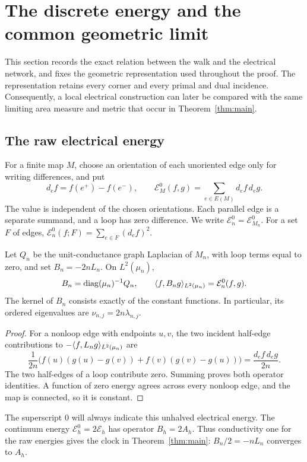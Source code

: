 \section{The discrete energy and the common geometric limit}\label{sec:model}

This section records the exact relation between the walk and the electrical
network, and fixes the geometric representation used throughout the proof.
The representation retains every corner and every primal and dual incidence.
Consequently, a local electrical construction can later be compared with the
same limiting area measure and metric that occur in Theorem~\ref{thm:main}.

\subsection{The raw electrical energy}

For a finite map \(M\), choose an orientation of each unoriented edge only for
writing differences, and put
\[
 d_e f=f(e^+)-f(e^-),\qquad
 \mathcal E_M^0(f,g)=\sum_{e\in E(M)}d_e f\,d_e g.
\]
The value is independent of the chosen orientations.  Each parallel edge is
a separate summand, and a loop has zero difference.  We write
\(\mathcal E_n^0=\mathcal E_{M_n}^0\).  For a set \(F\) of edges,
\(\mathcal E_n^0(f;F)=\sum_{e\in F}(d_e f)^2\).

\begin{lemma}\label{lem:normalization}
Let \(Q_n\) be the unit-conductance graph Laplacian of \(M_n\), with loop
terms equal to zero, and set \(B_n=-2nL_n\).  On \(L^2(\mu_n)\),
\[
 B_n=\operatorname{diag}(\mu_n)^{-1}Q_n,\qquad
 \langle f,B_ng\rangle_{L^2(\mu_n)}=\mathcal E_n^0(f,g).
\]
The kernel of \(B_n\) consists exactly of the constant functions.
In particular, its ordered eigenvalues are
\(\nu_{n,j}=2n\lambda_{n,j}\).
\end{lemma}

\begin{proof}
For a nonloop edge with endpoints \(u,v\), the two incident half-edge
contributions to \(-\langle f,L_ng\rangle_{L^2(\mu_n)}\) are
\[
 \frac{1}{2n}\bigl(f(u)(g(u)-g(v))+f(v)(g(v)-g(u))\bigr)
 =\frac{d_e f\,d_e g}{2n}.
\]
The two half-edges of a loop contribute zero.  Summing proves both operator
identities.  A function of zero energy agrees across every nonloop edge, and
the map is connected, so it is constant.
\end{proof}

The superscript \(0\) will always indicate this unhalved electrical energy.
The continuum energy \(\mathcal E_h^0=2\mathcal E_h\) has operator \(B_h=2A_h\).
Thus conductivity one for the raw energies gives the clock in
Theorem~\ref{thm:main}: \(B_n/2=-nL_n\) converges to \(A_h\).

